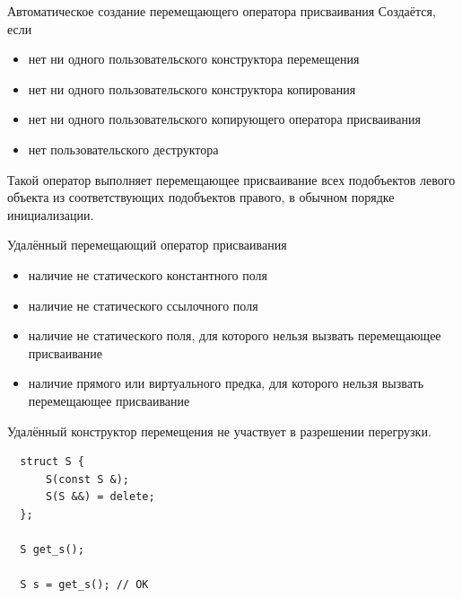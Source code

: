 \documentclass[unknownkeysallowed,xcolor=table]{beamer}
\begin{document}
\begin{frame}{Автоматическое создание перемещающего оператора присваивания}
  Создаётся, если
  \begin{itemize}
    \item нет ни одного пользовательского конструктора перемещения \vspace{0.5em}
    \item нет ни одного пользовательского конструктора копирования \vspace{0.5em}
    \item нет ни одного пользовательского копирующего оператора присваивания \vspace{0.5em}
    \item нет пользовательского деструктора
  \end{itemize}

  \vspace{1em}

  Такой оператор выполняет перемещающее присваивание всех подобъектов левого объекта из соответствующих подобъектов правого, в обычном порядке инициализации.
\end{frame}

\begin{frame}[fragile]{Удалённый перемещающий оператор присваивания}
  \begin{itemize}
    \item наличие не статического константного поля \vspace{0.5em}
    \item наличие не статического ссылочного поля \vspace{0.5em}
    \item наличие не статического поля, для которого нельзя вызвать перемещающее присваивание \vspace{0.5em}
    \item наличие прямого или виртуального предка, для которого нельзя вызвать перемещающее присваивание
  \end{itemize}

  \vspace{1em}

  Удалённый конструктор перемещения не участвует в разрешении перегрузки.
  \begin{lstlisting}
  struct S {
      S(const S &);
      S(S &&) = delete;
  };

  S get_s();

  S s = get_s(); // OK
  \end{lstlisting}
\end{frame}
\end{document}

